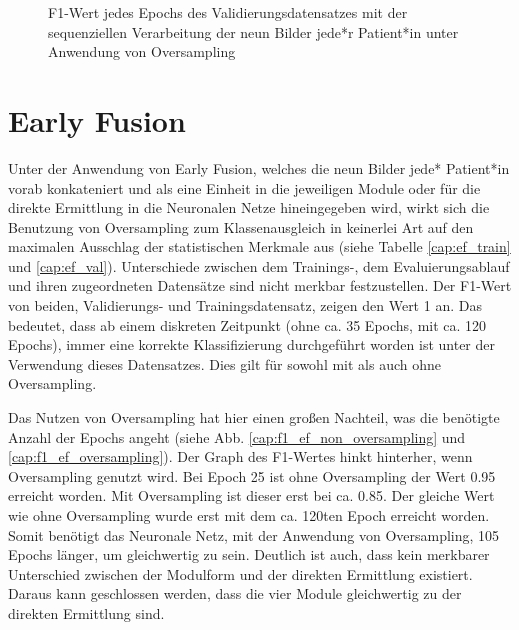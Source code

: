 \begin{figure}[b]\centering
\makebox[0pt]{}
\caption[F1-Wert jedes Epochs des Validierungsdatensatzes mit der sequenziellen Verarbeitung unter Anwendung von Oversampling]{F1-Wert jedes Epochs des Validierungsdatensatzes mit der sequenziellen Verarbeitung der neun Bilder jede*r Patient*in unter Anwendung von Oversampling}\label{cap:f1_sequential_oversampling}
\end{figure}\label{fig:f1_sequential_oversampling}





\clearpage
\section{Early Fusion}\label{earlyfusion}

Unter der Anwendung von Early Fusion, welches die neun Bilder jede* Patient*in vorab konkateniert und als eine Einheit in die jeweiligen Module oder für die direkte Ermittlung in die Neuronalen Netze hineingegeben wird, wirkt sich die Benutzung von Oversampling zum Klassenausgleich in keinerlei Art auf den maximalen Ausschlag der statistischen Merkmale aus (siehe Tabelle \ref{cap:ef_train} und \ref{cap:ef_val}). Unterschiede zwischen dem Trainings-, dem Evaluierungsablauf und ihren zugeordneten Datensätze sind nicht merkbar festzustellen. Der F1-Wert von beiden, Validierungs- und Trainingsdatensatz, zeigen den Wert 1 an. Das bedeutet, dass ab einem diskreten Zeitpunkt (ohne ca. 35 Epochs, mit ca. 120 Epochs), immer eine korrekte Klassifizierung durchgeführt worden ist unter der Verwendung dieses Datensatzes. Dies gilt für sowohl mit als auch ohne Oversampling.

Das Nutzen von Oversampling hat hier einen großen Nachteil, was die benötigte Anzahl der Epochs angeht (siehe Abb. \ref{cap:f1_ef_non_oversampling} und \ref{cap:f1_ef_oversampling}). Der Graph des F1-Wertes hinkt hinterher, wenn Oversampling genutzt wird. Bei Epoch 25 ist ohne Oversampling der Wert 0.95 erreicht worden. Mit Oversampling ist dieser erst bei ca. 0.85. Der gleiche Wert wie ohne Oversampling wurde erst mit dem ca. 120ten Epoch erreicht worden. Somit benötigt das Neuronale Netz, mit der Anwendung von Oversampling, 105 Epochs länger, um gleichwertig zu sein. Deutlich ist auch, dass kein merkbarer Unterschied zwischen der Modulform und der direkten Ermittlung existiert. Daraus kann geschlossen werden, dass die vier Module gleichwertig zu der direkten Ermittlung sind.

